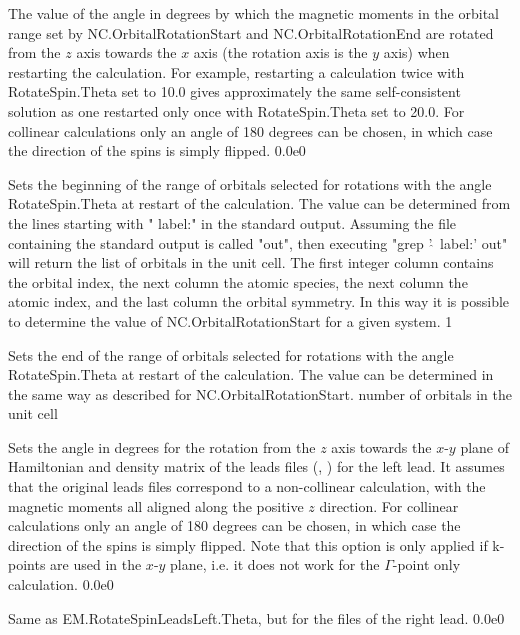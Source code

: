 \documentclass[11pt]{article}
\begin{document}
{
{The value of the angle in degrees by which the magnetic moments in the orbital range set by NC.OrbitalRotationStart and NC.OrbitalRotationEnd are rotated from the $z$ axis towards the $x$ axis (the rotation axis is the $y$ axis) when restarting the calculation. For example, restarting a calculation twice with RotateSpin.Theta set to 10.0 gives approximately the same self-consistent solution as one restarted only once with RotateSpin.Theta set to 20.0. For collinear calculations only an angle of 180 degrees can be chosen, in which case the direction of the spins is simply flipped.}
{0.0e0}


{Sets the beginning of the range of orbitals selected for rotations with the angle RotateSpin.Theta at restart of the calculation. The value can be determined from the lines starting with " label:" in the standard output. Assuming the file containing the standard output is called "out", then executing "grep  '$\hat{ ~}$ label:' out" will return the list of orbitals in the unit cell. The first integer column contains the orbital index, the next column the atomic species, the next column the atomic index, and the last column the orbital symmetry. In this way it is possible to determine the value of NC.OrbitalRotationStart for a given system.}
{1}

{Sets the end of the range of orbitals selected for rotations with the angle RotateSpin.Theta at restart of the calculation. The value can be determined in the same way as described for NC.OrbitalRotationStart.}
{number of orbitals in the unit cell}


{Sets the angle in degrees for the rotation from the $z$ axis towards the $x$-$y$ plane of Hamiltonian and density matrix of the leads files (, ) for the left lead. It assumes that the original leads files correspond to a non-collinear calculation, with the magnetic moments all aligned along the positive $z$ direction. For collinear calculations only an angle of 180 degrees can be chosen, in which case the direction of the spins is simply flipped. Note that this option is only applied if k-points are used in the $x$-$y$ plane, i.e. it does not work for the $\Gamma$-point only calculation.}
{0.0e0}

{Same as EM.RotateSpinLeadsLeft.Theta, but for the files of the right lead.}
{0.0e0}

}
\end{document}
